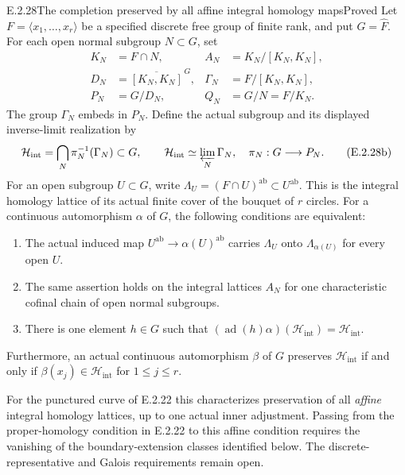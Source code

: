 \begin{result}{E.2.28}{The completion preserved by all affine integral homology maps}{Proved}
Let \(F=\langle x_1,\ldots,x_r\rangle\) be a specified discrete
free group of finite rank, and put \(G=\widehat F\). For each
open normal subgroup \(N\subset G\), set
\[
 \begin{aligned}
 K_N&=F\cap N,& A_N&=K_N/[K_N,K_N],\\
 D_N&=\overline{[K_N,K_N]}^{\,G},&
 \Gamma_N&=F/[K_N,K_N],\\
 P_N&=G/D_N,& Q_N&=G/N=F/K_N.
 \end{aligned}
 \tag{E.2.28a}
\]
The group \(\Gamma_N\) embeds in \(P_N\). Define the actual
subgroup and its displayed inverse-limit realization by
\[
 \mathcal H_{\mathrm{int}}
   =\bigcap_N\pi_N^{-1}(\Gamma_N)\subset G,
 \qquad
 \mathcal H_{\mathrm{int}}\simeq\varprojlim_N\Gamma_N,
 \quad \pi_N:G\longrightarrow P_N.
 \tag{E.2.28b}
\]
For an open subgroup \(U\subset G\), write
\(\Lambda_U=(F\cap U)^{\mathrm{ab}}\subset U^{\mathrm{ab}}\).
This is the integral homology lattice of its actual finite cover
of the bouquet of \(r\) circles. For a continuous automorphism
\(\alpha\) of \(G\), the following conditions are equivalent:
\begin{enumerate}
\item The actual induced map \(U^{\mathrm{ab}}\to
\alpha(U)^{\mathrm{ab}}\) carries \(\Lambda_U\) onto
\(\Lambda_{\alpha(U)}\) for every open \(U\).
\item The same assertion holds on the integral lattices \(A_N\)
for one characteristic cofinal chain of open normal subgroups.
\item There is one element \(h\in G\) such that
\((\operatorname{ad}(h)\alpha)(\mathcal H_{\mathrm{int}})
=\mathcal H_{\mathrm{int}}\).
\end{enumerate}
Furthermore, an actual continuous automorphism \(\beta\) of
\(G\) preserves \(\mathcal H_{\mathrm{int}}\) if and only if
\(\beta(x_j)\in\mathcal H_{\mathrm{int}}\) for
\(1\leq j\leq r\).

For the punctured curve of E.2.22 this characterizes preservation
of all \emph{affine} integral homology lattices, up to one actual
inner adjustment. Passing from the proper-homology condition in
E.2.22 to this affine condition requires the vanishing of the
boundary-extension classes identified below.
The discrete-representative and Galois requirements remain open.
\end{result}
